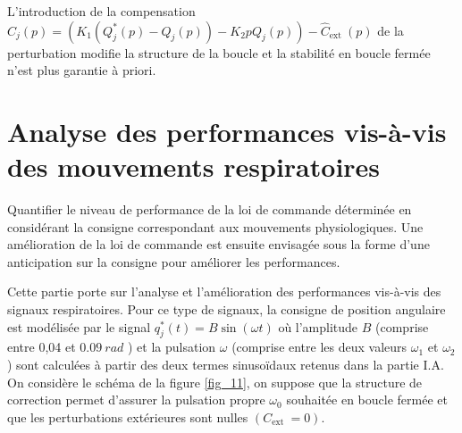 L'introduction de la compensation $C_{j}(p)=\left(K_{1}\left(Q_{j}^{*}(p)-Q_{j}(p)\right)-K_{2} p Q_{j}(p)\right)-\hat{C}_{\text {ext }}(p)$ de la perturbation modifie la structure de la boucle et la stabilité en boucle fermée n'est plus garantie à priori.


\section{Analyse des performances vis-à-vis des mouvements respiratoires}
\begin{obj}
Quantifier le niveau de performance de la loi de commande déterminée en considérant la consigne correspondant aux mouvements physiologiques. Une amélioration de la loi de commande est ensuite envisagée sous la forme d'une anticipation sur la consigne pour améliorer les performances.
\end{obj}

Cette partie porte sur l'analyse et l'amélioration des performances vis-à-vis des signaux respiratoires. Pour ce type de signaux, la consigne de position angulaire est modélisée par le signal $q_{j}^{*}(t)=B \sin (\omega t)$ où l'amplitude $B$ (comprise entre 0,04 et $\SI{0,09}{rad}$ ) et la pulsation $\omega$ (comprise entre les deux valeurs $\omega_{1}$ et $\omega_{2}$ ) sont calculées à partir des deux termes sinusoïdaux retenus dans la partie I.A. On considère le schéma de la figure \ref{fig_11}, on suppose que la structure de correction permet d'assurer la pulsation propre $\omega_{0}$ souhaitée en boucle fermée et que les perturbations extérieures sont nulles $\left(C_{\text {ext }}=0\right)$.\\


